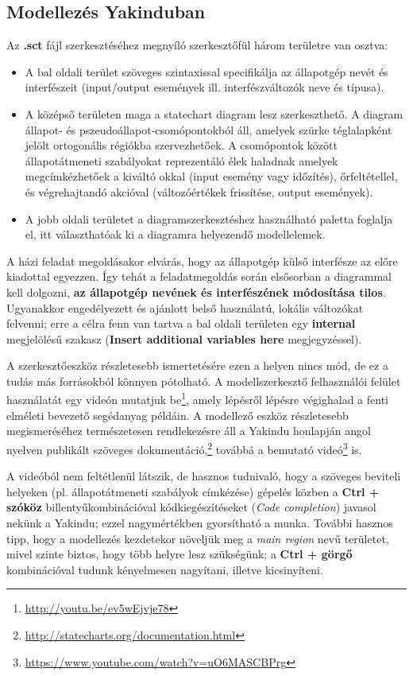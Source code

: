 \subsection{Modellezés Yakinduban}

Az \textbf{.sct} fájl szerkesztéséhez megnyíló szerkesztőfül három területre van osztva:

\begin{itemize}
	\item A bal oldali terület szöveges szintaxissal specifikálja az állapotgép nevét és interfészeit (input/output események ill. interfészváltozók neve és típusa).
	\item A középső területen maga a statechart diagram lesz szerkeszthető. A diagram állapot- és pszeudoállapot-csomópontokból áll, amelyek szürke téglalapként jelölt ortogonális régiókba szervezhetőek. A csomópontok között állapotátmeneti szabályokat reprezentáló élek haladnak amelyek megcímkézhetőek a kiváltó okkal (input esemény vagy időzítés), őrfeltétellel, és végrehajtandó akcióval (változóértékek frissítése, output események).
	\item A jobb oldali területet a diagramszerkesztéshez használható paletta foglalja el, itt választhatóak ki a diagramra helyezendő modellelemek.
\end{itemize}

A házi feladat megoldásakor elvárás, hogy az állapotgép külső interfésze az előre kiadottal egyezzen. Így tehát a feladatmegoldás során elsősorban a diagrammal kell dolgozni, \textbf{az állapotgép nevének és interfészének módosítása tilos}. Ugyanakkor engedélyezett és ajánlott belső használatú, lokális változókat felvenni; erre a célra fenn van tartva a bal oldali területen egy \textbf{internal} megjelölésű szakasz (\textbf{Insert additional variables here} megjegyzéssel).

A szerkesztőeszköz részletesebb ismertetésére ezen a helyen nincs mód, de ez a tudás más forrásokból könnyen pótolható. A modellszerkesztő felhasználói felület használatát egy videón mutatjuk be\footnote{\url{ http://youtu.be/ev5wEjvje78}}, amely lépésről lépésre végighalad a fenti elméleti bevezető segédanyag példáin. A modellező eszköz részletesebb megismeréséhez természetesen rendlekezésre áll a Yakindu honlapján angol nyelven publikált szöveges dokumentáció,\footnote{\url{http://statecharts.org/documentation.html}} továbbá a bemutató videó\footnote{\url{https://www.youtube.com/watch?v=uO6MASCBPrg}} is.

A videóból nem feltétlenül látszik, de hasznos tudnivaló, hogy a szöveges beviteli helyeken (pl. állapotátmeneti szabályok címkézése) gépelés közben a \textbf{Ctrl + szóköz} billentyűkombinációval kódkiegészítéseket (\emph{Code completion}) javasol nekünk a Yakindu; ezzel nagymértékben gyorsítható a munka. További hasznos tipp, hogy a modellezés kezdetekor növeljük meg a \emph{main region} nevű területet, mivel szinte biztos, hogy több helyre lesz szükségünk; a \textbf{Ctrl + görgő} kombinációval tudunk kényelmesen nagyítani, illetve kicsinyíteni.

